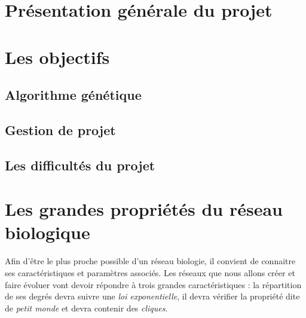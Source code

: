 


\maketitle

\section{Présentation générale du projet}


\section{Les objectifs}
\subsection*{Algorithme génétique}

\subsection*{Gestion de projet}

\subsection*{Les difficultés du projet}


\section{Les grandes propriétés du réseau biologique}
Afin d'être le plus proche possible d'un réseau biologie, il convient de connaitre ses caractéristiques et paramètres associés. Les réseaux que nous allons créer et faire évoluer vont devoir répondre à trois grandes caractéristiques : la répartition de ses degrés devra suivre une \textit{loi exponentielle}, il devra vérifier la propriété dite de \textit{\og petit monde \fg} et devra contenir des \textit{cliques}.

